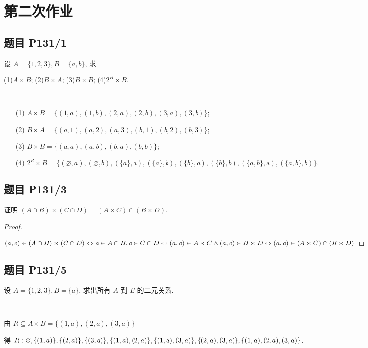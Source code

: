 \chapter{第二次作业}

\section{题目 P131/1}
设 $A=\{1,2,3\},B=\{a,b\}$, 求

(1)$A\times B$; (2)$B\times A$; (3)$B\times B$; (4)$2^B\times B$.

\begin{solution}\
	
	\begin{itemize}
		\item[(1)] $A\times B=\{(1,a),(1,b),(2,a),(2,b),(3,a),(3,b)\}$;
		\item[(2)] $B\times A=\{(a,1),(a,2),(a,3),(b,1),(b,2),(b,3)\}$;
		\item[(3)] $B\times B=\{(a,a),(a,b),(b,a),(b,b)\}$;
		\item[(4)] $2^B\times B=\{(\varnothing,a),(\varnothing,b),(\{a\},a),(\{a\},b),(\{b\},a),(\{b\},b),(\{a,b\},a),(\{a,b\},b)\}$.
	\end{itemize}
\end{solution}

\section{题目 P131/3}

证明 $(A\cap B)\times (C\cap D)=(A\times C)\cap (B\times D)$.

\begin{proof}\
	
$(a,c) \in (A\cap B)\times (C\cap D)\Leftrightarrow a\in A\cap B,c \in C\cap D\\ \Leftrightarrow (a,c) \in A\times C\wedge (a,c) \in B\times D \Leftrightarrow (a,c) \in (A\times C)\cap (B\times D)$
\end{proof}

\section{题目 P131/5}

设 $A=\{1,2,3\},B=\{a\}$, 求出所有 $A$ 到 $B$ 的二元关系.

\begin{solution}\
	
	由 $R\subseteq A\times B=\{(1,a),(2,a),(3,a)\}$
	
	得 $R:\varnothing,\{(1,a)\},\{(2,a)\},\{(3,a)\},\{(1,a),(2,a)\}, \\ \{(1,a),(3,a)\},\{(2,a),(3,a)\},\{(1,a),(2,a),(3,a)\}$.
\end{solution}

